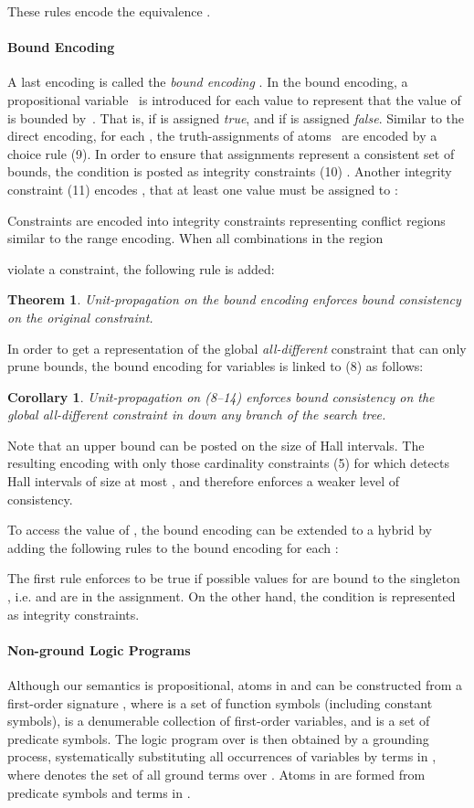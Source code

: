 \documentclass[letterpaper]{article}
\newtheorem{theorem}{Theorem}
\newtheorem{corollary}{Corollary}[theorem]
\begin{document}
These rules encode the equivalence .

\paragraph{Bound Encoding}
A last encoding is called the \emph{bound encoding} \cite{crba94a}. In the bound encoding, a propositional variable~ is introduced for each value  to represent that the value of~ is bounded by~. That is,  if  is assigned \emph{true}, and  if  is assigned \emph{false}. Similar to the direct encoding, for each , the truth-assignments of atoms~ are encoded by a choice rule (9). In order to ensure that assignments represent a consistent set of bounds, the condition  is posted as integrity constraints (10) . Another integrity constraint (11) encodes , that at least one value must be assigned to :

Constraints are encoded into integrity constraints representing conflict regions similar to the range encoding. When all combinations in the region

violate a constraint, the following rule is added:

\begin{theorem}
Unit-propagation on the bound encoding enforces bound consistency on the original constraint.
\end{theorem}
In order to get a representation of the global \emph{all-different} constraint that can only prune bounds, the bound encoding for variables is linked to (8) as follows:

\begin{corollary}
Unit-propagation on (8--14) enforces bound consistency on the global \emph{all-different} constraint in  down any branch of the search tree.
\end{corollary}
Note that an upper bound  can be posted on the size of Hall intervals. The resulting encoding with only those cardinality constraints (5) for which  detects Hall intervals of size at most , and therefore enforces a weaker level of consistency.

To access the value of , the bound encoding can be extended to a hybrid by adding the following rules to the bound encoding for each :

The first rule enforces  to be true if possible values for  are bound to the singleton , i.e.  and  are in the assignment. On the other hand, the condition  is represented as integrity constraints.

\paragraph{Non-ground Logic Programs}
Although our semantics is propositional, atoms in  and can be constructed from a first-order signature , where
 is a set of function symbols (including constant symbols),
 is a denumerable collection of first-order variables, and
 is a set of predicate symbols.
The logic program over  is then obtained by a grounding process, systematically substituting all occurrences of variables  by terms in , where  denotes the set of all ground terms over . Atoms in  are formed from predicate symbols  and terms in .
\end{document}

